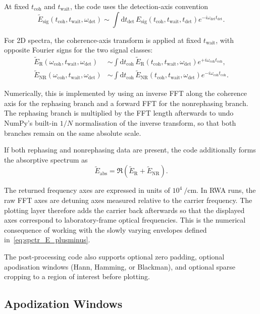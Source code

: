 At fixed \(t_{\mathrm{coh}}\) and \(t_{\mathrm{wait}}\), the code uses the
detection-axis convention
\[
\tilde{E}_{\mathrm{sig}}(t_{\mathrm{coh}},t_{\mathrm{wait}},\omega_{\mathrm{det}})
\sim
\int \mathrm{d}t_{\mathrm{det}}\,
E_{\mathrm{sig}}(t_{\mathrm{coh}},t_{\mathrm{wait}},t_{\mathrm{det}})
e^{-i\omega_{\mathrm{det}} t_{\mathrm{det}}}.
\]

For 2D spectra, the coherence-axis transform is applied at fixed
\(t_{\mathrm{wait}}\), with opposite Fourier signs for the two signal classes:
\begin{align*}
\tilde{E}_{\mathrm{R}}(\omega_{\mathrm{coh}},t_{\mathrm{wait}},\omega_{\mathrm{det}})
&\sim
\int \mathrm{d}t_{\mathrm{coh}}\,
\tilde{E}_{\mathrm{R}}(t_{\mathrm{coh}},t_{\mathrm{wait}},\omega_{\mathrm{det}})
e^{+i\omega_{\mathrm{coh}} t_{\mathrm{coh}}},
\\
\tilde{E}_{\mathrm{NR}}(\omega_{\mathrm{coh}},t_{\mathrm{wait}},\omega_{\mathrm{det}})
&\sim
\int \mathrm{d}t_{\mathrm{coh}}\,
\tilde{E}_{\mathrm{NR}}(t_{\mathrm{coh}},t_{\mathrm{wait}},\omega_{\mathrm{det}})
e^{-i\omega_{\mathrm{coh}} t_{\mathrm{coh}}}.
\end{align*}

Numerically, this is implemented by using an inverse FFT along the coherence
axis for the rephasing branch and a forward FFT for the nonrephasing branch.
The rephasing branch is multiplied by the FFT length afterwards to undo
NumPy's built-in \(1/N\) normalisation of the inverse transform, so that both
branches remain on the same absolute scale.

If both rephasing and nonrephasing data are present, the code additionally
forms the absorptive spectrum as
\[
\tilde{E}_{\mathrm{abs}}
=
\Re\!\left(\tilde{E}_{\mathrm{R}}+\tilde{E}_{\mathrm{NR}}\right).
\]

The returned frequency axes are expressed in units of
\(10^4~\si{\per\centi\metre}\). In RWA runs, the raw FFT axes are detuning axes
measured relative to the carrier frequency. The plotting layer therefore adds
the carrier back afterwards so that the displayed axes correspond to
laboratory-frame optical frequencies. This is the numerical consequence of
working with the slowly varying envelopes defined
in~\autoref{eq:spctr_E_plusminus}.

The post-processing code also supports optional zero padding, optional
apodisation windows (Hann, Hamming, or Blackman), and optional sparse cropping
to a region of interest before plotting.

\subsection{Apodization Windows}

